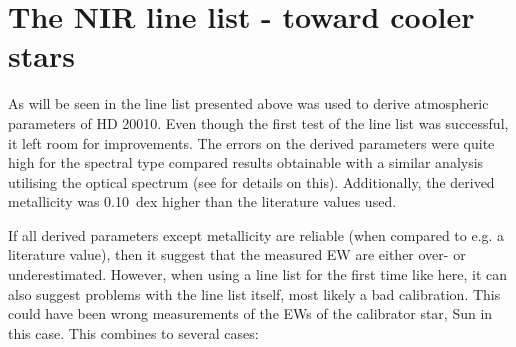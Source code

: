 \section{The NIR line list - toward cooler stars}
\label{sec:linelist_second}

As will be seen in  the line list presented above was used to derive
atmospheric parameters of HD 20010. Even though the first test of the line list was successful, it
left room for improvements. The errors on the derived parameters were quite high for the spectral
type compared results obtainable with a similar analysis utilising the optical spectrum (see
 for details on this). Additionally, the derived metallicity was
\SI{0.10}{dex} higher than the literature values used.

If all derived parameters except metallicity are reliable (when compared to e.g. a literature
value), then it suggest that the measured EW are either over- or underestimated. However, when using
a line list for the first time like here, it can also suggest problems with the line list itself,
most likely a bad calibration. This could have been wrong measurements of the EWs of the calibrator
star, Sun in this case. This combines to several cases:
